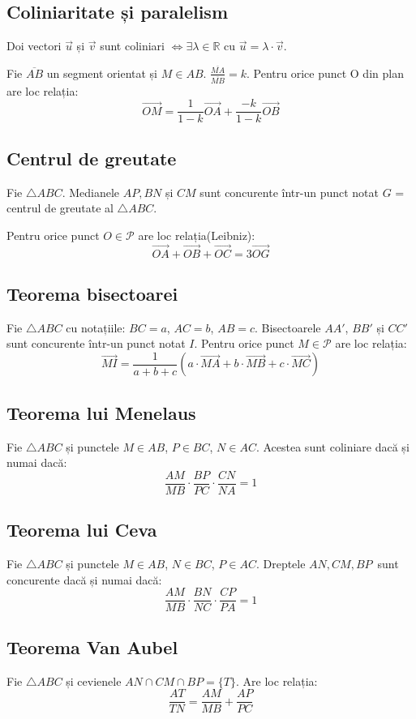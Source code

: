 \documentclass[11pt,a4paper]{article}
\begin{document}
\subsection{Coliniaritate și paralelism}
Doi vectori $\overrightarrow{u}$ și $\overrightarrow{v}$ sunt coliniari $\Leftrightarrow \exists \lambda \in \mathbb{R}$ cu $\overrightarrow{u}= \lambda \cdot \overrightarrow{v}$.


Fie $\overline{AB}$ un segment orientat și $M \in AB $. $\frac{\overline{MA}}{\overline{MB}}=k$.
Pentru orice punct O din plan are loc relația: \[\overrightarrow{OM}=\frac{1}{1-k}\overrightarrow{OA}+\frac{-k}{1-k}\overrightarrow{OB}\]
\subsection{Centrul de greutate}
Fie $\triangle{ABC}$. Medianele $AP, BN$  și $ CM$ sunt concurente într-un punct notat $G$ = centrul de greutate al $\triangle{ABC}$.

Pentru orice punct $O \in \mathcal{P}$ are loc relația(Leibniz): \[\overrightarrow{OA}+\overrightarrow{OB}+\overrightarrow{OC}=3\overrightarrow{OG}\]
\subsection{Teorema bisectoarei}
Fie $\triangle{ABC}$ cu notațiile: $BC=a$, $AC=b$, $AB=c$. Bisectoarele $AA'$, $BB'$ și $CC'$ sunt concurente într-un punct notat $I$. Pentru orice punct $M \in \mathcal{P}$ are loc relația: \[\overrightarrow{MI}=\frac{1}{a+b+c}\left(a \cdot \overrightarrow{MA}+ b \cdot \overrightarrow{MB}+ c \cdot \overrightarrow{MC}\right)\]
\subsection{Teorema lui Menelaus}
Fie $\triangle{ABC}$ și punctele $M \in AB$, $P \in BC$, $N \in AC$. Acestea sunt coliniare dacă și numai dacă: \[\frac{AM}{MB}\cdot \frac{BP}{PC} \cdot \frac{CN}{NA}=1\]
\subsection{Teorema lui Ceva}
Fie $\triangle{ABC}$ și punctele $M \in AB$, $N \in BC$, $P \in AC$. Dreptele $AN, CM, BP$\, sunt concurente dacă și numai dacă: \[\frac{AM}{MB}\cdot \frac{BN}{NC} \cdot \frac{CP}{PA}=1\]
\subsection{Teorema Van Aubel}
Fie $\triangle{ABC}$ și cevienele $AN \cap CM \cap BP =\{T\}$. Are loc relația: \[\frac{AT}{TN}=\frac{AM}{MB}+\frac{AP}{PC}\]
\end{document}
